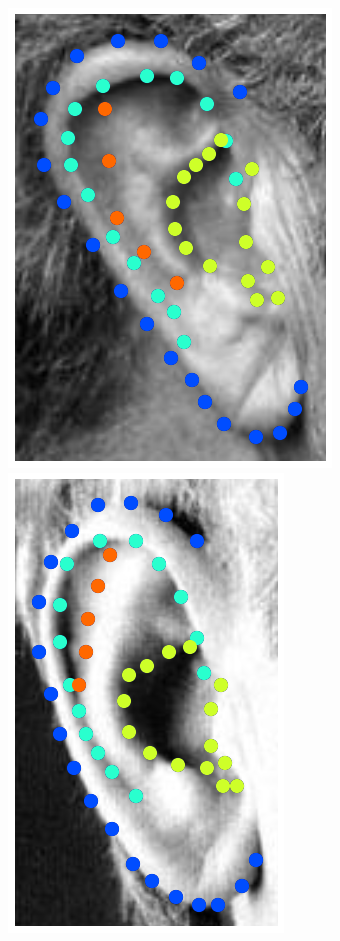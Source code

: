 \begin{figure}[!b]
    \includegraphics[height=\flowhhh]{resources/Ear_Deformable_Model/dbs/db_8} 
    \hfill
    \includegraphics[height=\flowhhh]{resources/Ear_Deformable_Model/dbs/db_9}
    \hfill

\end{figure}
